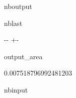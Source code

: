 \documentclass[letterpaper,10pt,english]{sphinxmanual}
\begin{document}
\begin{sphinxuseclass}{nboutput}
\begin{sphinxuseclass}{nblast}
{

\kern-\sphinxverbatimsmallskipamount\kern-\baselineskip
\kern+\FrameHeightAdjust\kern-\fboxrule
\vspace{\nbsphinxcodecellspacing}

\begin{sphinxuseclass}{output_area}
\begin{sphinxuseclass}{}


\begin{sphinxVerbatim}[commandchars=\\\{\}]
\llap{\color{nbsphinxout}[4]:\,\hspace{\fboxrule}\hspace{\fboxsep}}0.007518796992481203
\end{sphinxVerbatim}



\end{sphinxuseclass}
\end{sphinxuseclass}
}

\end{sphinxuseclass}
\end{sphinxuseclass}
\begin{sphinxuseclass}{nbinput}
{
\begin{sphinxVerbatim}[commandchars=\\\{\}]
\llap{\color{nbsphinxin}[5]:\,\hspace{\fboxrule}\hspace{\fboxsep}}
\end{sphinxVerbatim}
}

\end{sphinxuseclass}
\end{document}
